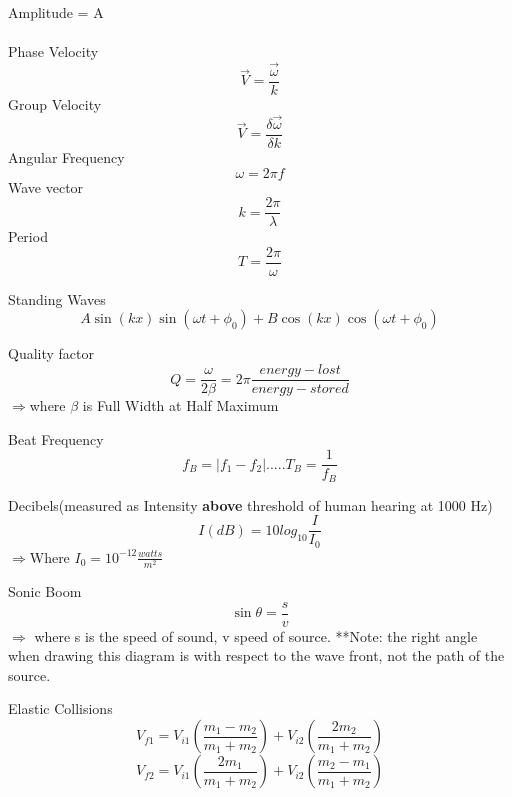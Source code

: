 \documentclass{article}
\begin{document}
{Amplitude = A\\\\
Phase Velocity\begin{equation}\vec{V}=\frac{\vec{\omega}}{k}\end{equation}
Group Velocity\begin{equation}\vec{V}=\frac{\delta \vec{\omega}}{\delta k}\end{equation}
Angular Frequency\begin{equation}\omega = 2\pi f \end{equation}
Wave vector\begin{equation}k = \frac{2\pi}{\lambda}\end{equation}
Period\begin{equation} T = \frac{2\pi}{\omega}\end{equation}

Standing Waves\begin{equation}A\sin(kx)\sin(\omega t+\phi_0)+B\cos(kx)\cos(\omega t+\phi_0)\end{equation}

Quality factor\begin{equation}Q=\frac{\omega}{2\beta}=2\pi \frac{energy-lost}{energy-stored}\end{equation}
$\Rightarrow$where $\beta$ is Full Width at Half Maximum

Beat Frequency\begin{equation}f_B=|f_1-f_2|.....T_B = \frac{1}{f_B}\end{equation}

Decibels(measured as Intensity {\bf above} threshold of human hearing at 1000 Hz)\begin{equation}I(dB)=10log_{10}\frac{I}{I_0}\end{equation}
$\Rightarrow$Where $I_0 = 10^{-12} \frac{watts}{m^2}$

Sonic Boom\begin{equation}\sin{\theta} = \frac{s}{v}\end{equation}
$\Rightarrow$ where s is the speed of sound, v speed of source.  **Note: the right angle when drawing this diagram is with respect to the wave front, not the path of the source.

Elastic Collisions\begin{equation}V_{f1}=V_{i1}(\frac{m_1-m_2}{m_1+m_2})+V_{i2}(\frac{2m_2}{m_1+m_2})\end{equation}
\begin{equation}V_{f2}=V_{i1}(\frac{2m_1}{m_1+m_2})+V_{i2}(\frac{m_2-m_1}{m_1+m_2})\end{equation}

}
\end{document}
